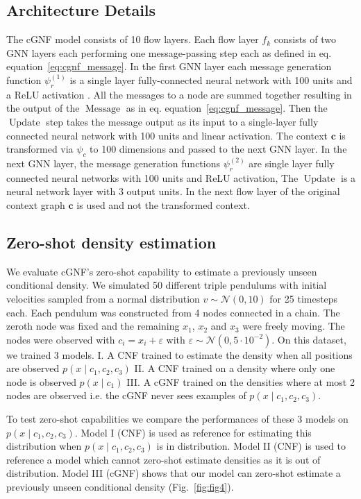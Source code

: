 \documentclass{article} \usepackage{iclr2023_conference,times}
\def\eqref#1{equation~\ref{#1}}
\def\vc{{\bm{c}}}
\begin{document}
\subsection{Architecture Details}
\label{sec:app_arch_dets}
The cGNF model consists of 10 flow layers.
Each flow layer $f_k$ consists of two GNN layers each performing one message-passing step each as defined in eq. \eqref{eq:cgnf_message}.
In the first GNN layer each message generation function $\psi_r^{(1)}$ is a single layer fully-connected neural network with 100 units and a ReLU activation \citep{agarap2018deep}. All the messages to a node are summed together resulting in the output of the $\operatorname{Message}$ as in eq. \eqref{eq:cgnf_message}. Then the $\operatorname{Update}$ step takes the message output as its input to a single-layer fully connected neural network with 100 units and linear activation.
The context $\vc$ is transformed via $\psi_c$ to 100 dimensions and passed to the next GNN layer.
In the next GNN layer, the message generation functions $\psi_r^{(2)}$ are single layer fully connected neural networks with 100 units and ReLU activation,
The $\operatorname{Update}$ is a neural network layer with 3 output units.
In the next flow layer of the original context graph $\vc$ is used and not the transformed context.

\subsection{Zero-shot density estimation}
\label{sec:zero_shot}
We evaluate cGNF's zero-shot capability to estimate a previously unseen conditional density.
We simulated 50 different triple pendulums with initial velocities sampled from a normal distribution $v \sim \mathcal{N}(0, 10)$ for 25 timesteps each.
Each pendulum was constructed from 4 nodes connected in a chain. The zeroth node was fixed and the remaining $x_1$, $x_2$ and $x_3$ were freely moving.
The nodes were observed with $c_i = x_i + \varepsilon$ with $\varepsilon \sim \mathcal{N}(0, 5 \cdot 10^{-2})$.
On this dataset, we trained 3 models. I. A CNF trained to estimate the density when all positions are observed $p(x \mid c_1, c_2, c_3)$ II. A CNF trained on a density where only one node is observed $p(x \mid c_1)$ III. A cGNF trained on the densities where at most 2 nodes are observed i.e. the cGNF never sees examples of $p(x \mid c_1, c_2, c_3)$.

To test zero-shot capabilities we compare the performances of these 3 models on $p(x \mid c_1, c_2, c_3)$. Model I (CNF) is used as reference for estimating this distribution when $p(x \mid c_1, c_2, c_3)$ is in distribution. Model II (CNF) is used to reference a model which cannot zero-shot estimate densities as it is out of distribution. Model III (cGNF) shows that our model can zero-shot estimate a previously unseen conditional density (Fig.~\ref{fig:fig4}).
\end{document}

